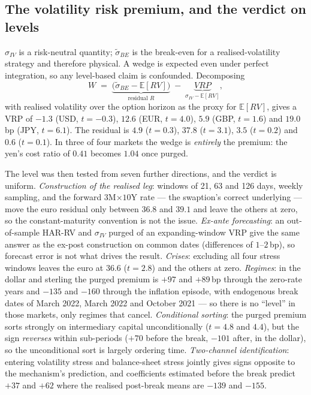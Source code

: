 \documentclass[11pt]{article}
\begin{document}
\subsection{The volatility risk premium, and the verdict on levels}\label{sec:vrp}
$\sigma_{IV}$ is a risk-neutral quantity; $\tilde\sigma_{BE}$ is the break-even for a realised-volatility
strategy and therefore physical. A wedge is expected even under perfect integration, so any
level-based claim is confounded. Decomposing
\[
W \;=\; \underbrace{\bigl(\tilde\sigma_{BE}-\mathbb{E}[RV]\bigr)}_{\text{residual }R}\;-\;\underbrace{VRP}_{\sigma_{IV}-\mathbb{E}[RV]},
\]
with realised volatility over the option horizon as the proxy for $\mathbb{E}[RV]$, gives a VRP of
$-1.3$ (USD, $t=-0.3$), $12.6$ (EUR, $t=4.0$), $5.9$ (GBP, $t=1.6$) and $19.0$\,bp (JPY, $t=6.1$).
The residual is $4.9$ ($t=0.3$), $37.8$ ($t=3.1$), $3.5$ ($t=0.2$) and $0.6$ ($t=0.1$). In three of
four markets the wedge is \emph{entirely} the premium: the yen's cost ratio of $0.41$ becomes $1.04$
once purged.

The level was then tested from seven further directions, and the verdict is uniform.
\emph{Construction of the realised leg}: windows of 21, 63 and 126 days, weekly sampling, and the
forward $3$M$\times$$10$Y rate --- the swaption's correct underlying --- move the euro residual only
between $36.8$ and $39.1$ and leave the others at zero, so the constant-maturity convention is not
the issue. \emph{Ex-ante forecasting}: an out-of-sample HAR-RV and $\sigma_{IV}$ purged of an
expanding-window VRP give the same answer as the ex-post construction on common dates (differences
of $1$--$2$\,bp), so forecast error is not what drives the result. \emph{Crises}: excluding all four
stress windows leaves the euro at $36.6$ ($t=2.8$) and the others at zero. \emph{Regimes}: in the
dollar and sterling the purged premium is $+97$ and $+89$\,bp through the zero-rate years and $-135$
and $-160$ through the inflation episode, with endogenous break dates of March 2022, March 2022 and
October 2021 --- so there is no ``level'' in those markets, only regimes that cancel.
\emph{Conditional sorting}: the purged premium sorts strongly on intermediary capital
unconditionally ($t=4.8$ and $4.4$), but the sign \emph{reverses} within sub-periods ($+70$ before
the break, $-101$ after, in the dollar), so the unconditional sort is largely ordering time.
\emph{Two-channel identification}: entering volatility stress and balance-sheet stress jointly gives
signs opposite to the mechanism's prediction, and coefficients estimated before the break predict
$+37$ and $+62$ where the realised post-break means are $-139$ and $-155$.
\end{document}
